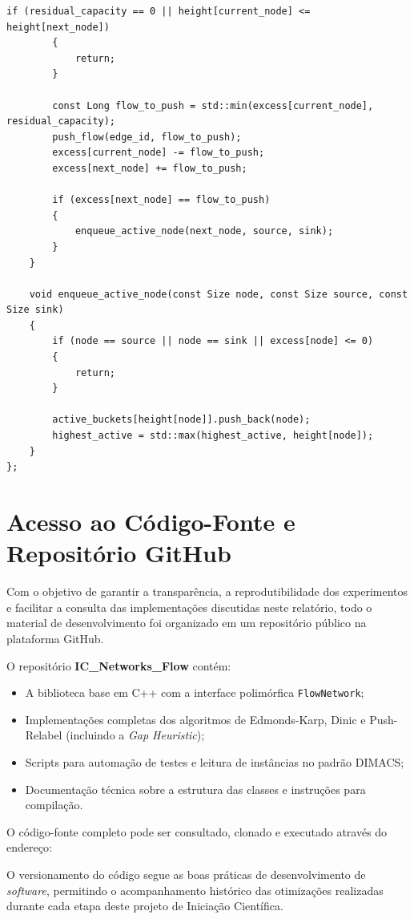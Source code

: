 \documentclass[12pt,a4paper]{article}
\begin{document}
\begin{lstlisting}[caption={Implementação em C++ da classe \lstinline{PushRelabelImproved}, otimizada empiricamente com a Heurística de Lacuna (\textit{Gap Heuristic}).}, label={lst:push_relabel_improved}]
		if (residual_capacity == 0 || height[current_node] <= height[next_node])
		{
			return;
		}

		const Long flow_to_push = std::min(excess[current_node], residual_capacity);
		push_flow(edge_id, flow_to_push);
		excess[current_node] -= flow_to_push;
		excess[next_node] += flow_to_push;

		if (excess[next_node] == flow_to_push)
		{
			enqueue_active_node(next_node, source, sink);
		}
	}

	void enqueue_active_node(const Size node, const Size source, const Size sink)
	{
		if (node == source || node == sink || excess[node] <= 0)
		{
			return;
		}

		active_buckets[height[node]].push_back(node);
		highest_active = std::max(highest_active, height[node]);
	}
};
\end{lstlisting}

\newpage
\section{Acesso ao Código-Fonte e Repositório GitHub}
\label{ap:github}

Com o objetivo de garantir a transparência, a reprodutibilidade dos experimentos e facilitar a consulta das implementações discutidas neste relatório, todo o material de desenvolvimento foi organizado em um repositório público na plataforma GitHub.

O repositório \textbf{IC\_Networks\_Flow} contém:
\begin{itemize}
    \item A biblioteca base em C++ com a interface polimórfica \lstinline{FlowNetwork};
    \item Implementações completas dos algoritmos de Edmonds-Karp, Dinic e Push-Relabel (incluindo a \textit{Gap Heuristic});
    \item Scripts para automação de testes e leitura de instâncias no padrão DIMACS;
    \item Documentação técnica sobre a estrutura das classes e instruções para compilação.
\end{itemize}

O código-fonte completo pode ser consultado, clonado e executado através do endereço:

\vspace{0.4cm}
\begin{center}
\end{center}
\vspace{0.4cm}

O versionamento do código segue as boas práticas de desenvolvimento de \textit{software}, permitindo o acompanhamento histórico das otimizações realizadas durante cada etapa deste projeto de Iniciação Científica.
\end{document}
